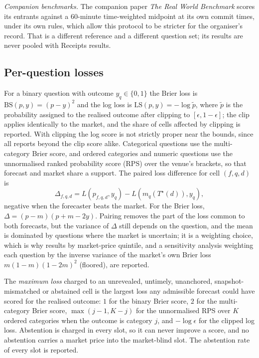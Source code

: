 \documentclass[11pt]{article}
\newcommand{\Ts}{T^{\star}}
\begin{document}
\emph{Companion benchmarks.} The companion paper \emph{The Real World Benchmark} scores its entrants against a 60-minute time-weighted midpoint at its own commit times, under its own rules, which allow this protocol to be stricter for the organiser's record. That is a different reference and a different question set; its results are never pooled with Receipts results.

\subsection{Per-question losses}

For a binary question with outcome $y_q \in \{0,1\}$ the Brier loss is $\mathrm{BS}(p,y) = (p-y)^2$ and the log loss is $\mathrm{LS}(p,y) = -\log \tilde p$, where $\tilde p$ is the probability assigned to the realised outcome after clipping to $[\epsilon, 1-\epsilon]$; the clip applies identically to the market, and the share of cells affected by clipping is reported. With clipping the log score is not strictly proper near the bounds, since all reports beyond the clip score alike. Categorical questions use the multi-category Brier score, and ordered categories and numeric questions use the unnormalised ranked probability score (RPS) over the venue's brackets, so that forecast and market share a support. The paired loss difference for cell $(f,q,d)$ is
\begin{equation}
  \Delta_{f,q,d} = L(p_{f,q,d}, y_q) - L(m_q(\Ts(d)), y_q),
\end{equation}
negative when the forecaster beats the market. For the Brier loss, $\Delta = (p-m)(p+m-2y)$. Pairing removes the part of the loss common to both forecasts, but the variance of $\Delta$ still depends on the question, and the mean is dominated by questions where the market is uncertain; it is a weighting choice, which is why results by market-price quintile, and a sensitivity analysis weighting each question by the inverse variance of the market's own Brier loss $m(1-m)(1-2m)^2$ (floored), are reported.

The \emph{maximum loss} charged to an unrevealed, untimely, unanchored, snapshot-mismatched or abstained cell is the largest loss any admissible forecast could have scored for the realised outcome: $1$ for the binary Brier score, $2$ for the multi-category Brier score, $\max(j-1, K-j)$ for the unnormalised RPS over $K$ ordered categories when the outcome is category $j$, and $-\log \epsilon$ for the clipped log loss. Abstention is charged in every slot, so it can never improve a score, and no abstention carries a market price into the market-blind slot. The abstention rate of every slot is reported.
\end{document}
